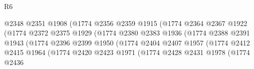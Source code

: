 \begin{lexlean}{R6}
\begin{coremodule}
                                          @2348
                                          @2351
                                          @1908
                                          (@1774
                                            @2356
                                            @2359
                                            @1915
                                            (@1774
                                              @2364
                                              @2367
                                              @1922
                                              (@1774
                                                @2372
                                                @2375
                                                @1929
                                                (@1774
                                                  @2380
                                                  @2383
                                                  @1936
                                                  (@1774
                                                    @2388
                                                    @2391
                                                    @1943
                                                    (@1774
                                                      @2396
                                                      @2399
                                                      @1950
                                                      (@1774
                                                        @2404
                                                        @2407
                                                        @1957
                                                        (@1774
                                                          @2412
                                                          @2415
                                                          @1964
                                                          (@1774
                                                            @2420
                                                            @2423
                                                            @1971
                                                            (@1774
                                                              @2428
                                                              @2431
                                                              @1978
                                                              (@1774
                                                                @2436

\end{coremodule}
\end{lexlean}
